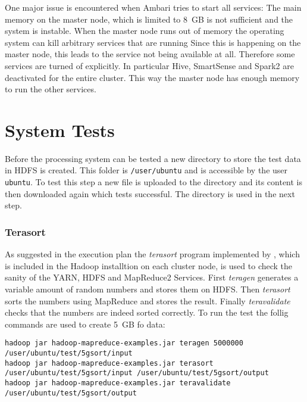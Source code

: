 One major issue is encountered when Ambari tries to start all services: The main memory on the master node, which is limited to 8~\ac{GB} is not sufficient and the system is instable.
When the master node runs out of memory the operating system can kill arbitrary services that are running
Since this is happening on the master node, this leads to the service not being available at all.
Therefore some services are turned of explicitly. In particular Hive, SmartSense and Spark2 are deactivated for the entire cluster. 
This way the master node has enough memory to run the other services.

\section{System Tests}

Before the processing system can be tested a new directory to store the test data in \ac{HDFS}
is created. 
This folder is \texttt{/user/ubuntu} and is accessible by the user \texttt{ubuntu}.
To test this step a new file is uploaded to the directory and its content is then downloaded again which tests successful. The directory is used in the next step.

\subsubsection{Terasort}

As suggested in the execution plan the \emph{terasort} program implemented by \textcite{omally2008terasort}, which is included in the Hadoop installtion on each cluster node, is used to check the sanity of the \ac{YARN}, \ac{HDFS} and MapReduce2 Services.
First \emph{teragen} generates a variable amount of random numbers and stores them on \ac{HDFS}. Then \emph{terasort} sorts the numbers using MapReduce and stores the result.
Finally \emph{teravalidate} checks that the numbers are indeed sorted correctly.
To run the test the follig commands are used to create 5~\ac{GB} fo data:\\

\lstset{language=sh}
\begin{lstlisting}[caption={Running Terasort as a test for YARN and HDFS}, label={lst:terasort}]
hadoop jar hadoop-mapreduce-examples.jar teragen 5000000 /user/ubuntu/test/5gsort/input
hadoop jar hadoop-mapreduce-examples.jar terasort /user/ubuntu/test/5gsort/input /user/ubuntu/test/5gsort/output
hadoop jar hadoop-mapreduce-examples.jar teravalidate /user/ubuntu/test/5gsort/output
\end{lstlisting}

